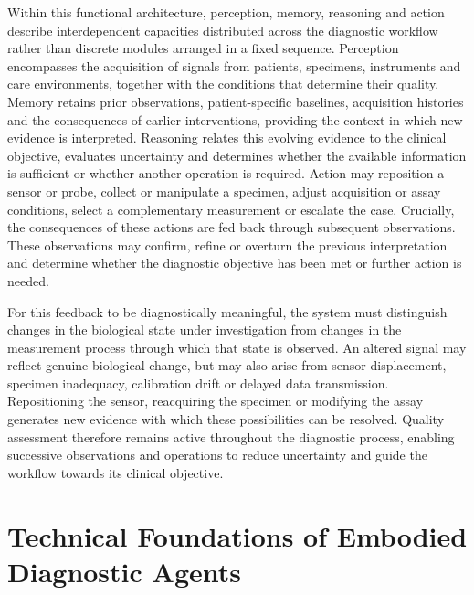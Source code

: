 \documentclass[12pt,a4paper]{article}
\begin{document}
Within this functional architecture, perception, memory, reasoning and action describe interdependent capacities distributed across the diagnostic workflow rather than discrete modules arranged in a fixed sequence. Perception encompasses the acquisition of signals from patients, specimens, instruments and care environments, together with the conditions that determine their quality. Memory retains prior observations, patient-specific baselines, acquisition histories and the consequences of earlier interventions, providing the context in which new evidence is interpreted. Reasoning relates this evolving evidence to the clinical objective, evaluates uncertainty and determines whether the available information is sufficient or whether another operation is required. Action may reposition a sensor or probe, collect or manipulate a specimen, adjust acquisition or assay conditions, select a complementary measurement or escalate the case. Crucially, the consequences of these actions are fed back through subsequent observations. These observations may confirm, refine or overturn the previous interpretation and determine whether the diagnostic objective has been met or further action is needed.

For this feedback to be diagnostically meaningful, the system must distinguish changes in the biological state under investigation from changes in the measurement process through which that state is observed. An altered signal may reflect genuine biological change, but may also arise from sensor displacement, specimen inadequacy, calibration drift or delayed data transmission. Repositioning the sensor, reacquiring the specimen or modifying the assay generates new evidence with which these possibilities can be resolved. Quality assessment therefore remains active throughout the diagnostic process, enabling successive observations and operations to reduce uncertainty and guide the workflow towards its clinical objective.


\section{Technical Foundations of Embodied Diagnostic Agents}
\label{sec:technical_enablers}



\end{document}
